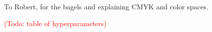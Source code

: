 \documentclass[sigconf,authordraft]{acmart}
\newcommand{\todo}[1]{\textcolor{red}{(Todo: #1)}}
\begin{document}
\begin{acks}
  To Robert, for the bagels and explaining CMYK and color spaces.
\end{acks}




\appendix

\todo{table of hyperparameters}
\end{document}
